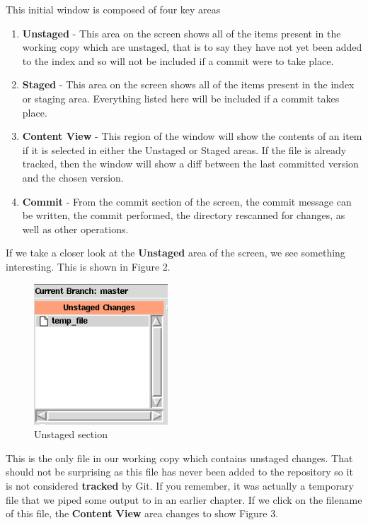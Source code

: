 This initial window is composed of four key areas
\begin{enumerate}
\item \textbf{Unstaged} - This area on the screen shows all of the items present in the working copy which are unstaged, that is to say they have not yet been added to the index and so will not be included if a commit were to take place.
\item \textbf{Staged} - This area on the screen shows all of the items present in the index or staging area.
Everything listed here will be included if a commit takes place.
\item \textbf{Content View} - This region of the window will show the contents of an item if it is selected in either the Unstaged or Staged areas.
If the file is already tracked, then the window will show a diff between the last committed version and the chosen version.
\item \textbf{Commit} - From the commit section of the screen, the commit message can be written, the commit performed, the directory rescanned for changes, as well as other operations.
\end{enumerate}

If we take a closer look at the \textbf{Unstaged} area of the screen, we see something interesting.
This is shown in Figure 2.

\begin{figure}[hbt]
\centering
\includegraphics[width=5cm]{images/f-w5-d2.png}
\caption{Unstaged section}
\end{figure}

This is the only file in our working copy which contains unstaged changes.
That should not be surprising as this file has never been added to the repository so it is not considered \textbf{tracked} by Git.
If you remember, it was actually a temporary file that we piped some output to in an earlier chapter.
If we click on the filename of this file, the \textbf{Content View} area changes to show Figure 3.

